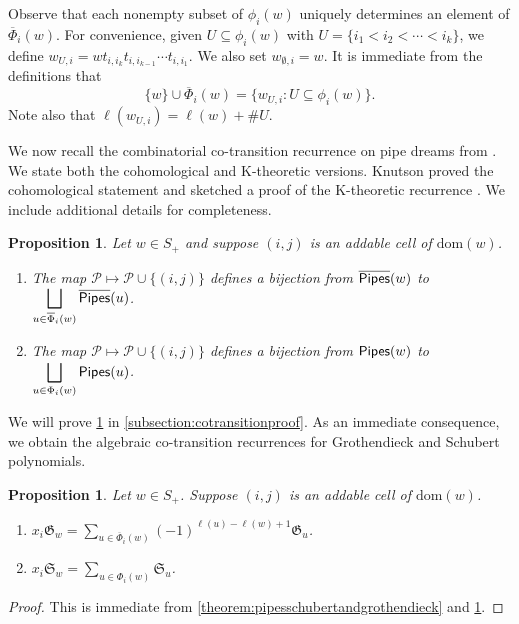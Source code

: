 \documentclass[12 pt]{amsart}
\newcommand{\dom}{\mathrm{dom}}
\newtheorem{proposition}[Theorem]{Proposition}
\numberwithin{equation}{section}
\theoremstyle{remark}
\newcommand{\pipes}{{\sf Pipes}}
\newcommand{\kpipes}{\overline{\sf Pipes}}
\newcommand{\cotransitionperms}{\Phi}
\newcommand{\cotransitionindices}{\phi}
\newcommand{\kcotransitionperms}{\overline{\Phi}}
\begin{document}
		Observe that each nonempty subset of $\cotransitionindices_i(w)$ uniquely determines an element of $\kcotransitionperms_i(w)$. 
		For convenience, given $U \subseteq \cotransitionindices_i(w)$ with $U = \{i_1 < i_2 < \cdots < i_k\}$, we define 
		$w_{U,i} = wt_{i,i_k} t_{i,i_{k-1}}\cdots t_{i,i_1}$. We also set $w_{\emptyset,i} = w$. It is immediate from the definitions that
		\begin{equation}
		\{w\}\cup \kcotransitionperms_i(w) = \{w_{U,i} : U \subseteq \cotransitionindices_{i}(w)\}.
		\end{equation}
		Note also that $\ell(w_{U,i})=\ell(w)+\#U$.
		
		We now recall the combinatorial co-transition recurrence on pipe dreams from \cite{Knutson:cotransition}. 
		We state both the cohomological and K-theoretic versions. 
		Knutson proved the cohomological statement and sketched a proof of the K-theoretic recurrence \cite{Knutson:cotransition}.
		We include additional details for completeness.
		
		\begin{proposition}
			\label{prop:kcotransitionpipefacts}
			Let $w \in S_+$ and suppose $(i,j)$ is an addable cell of $\dom(w)$.
			\begin{enumerate}
				\item The map $\mathcal{P} \mapsto \mathcal{P} \cup \{(i,j)\}$ defines a bijection from $\kpipes(w)$ to $\displaystyle \bigsqcup_{u \in \kcotransitionperms_i(w)} \kpipes(u)$.
				\item The map $\mathcal{P} \mapsto \mathcal{P} \cup \{(i,j)\}$ defines a bijection from $\pipes(w)$ to $\displaystyle \bigsqcup_{u \in\cotransitionperms_i(w)} \pipes(u)$.
			\end{enumerate}
		\end{proposition}
		We will prove \cref{prop:kcotransitionpipefacts} in \cref{subsection:cotransitionproof}.
		As an immediate consequence, we obtain the algebraic co-transition recurrences for Grothendieck and Schubert polynomials.
	
	\begin{proposition}
		\label{prop:kcotransition}
		Let $w \in S_+$. Suppose $(i,j)$ is an addable cell of $\dom(w)$.
		\begin{enumerate}
			\item $\displaystyle x_i\mathfrak{G}_w = \sum_{u \in \kcotransitionperms_i(w)} (-1)^{\ell(u) - \ell(w) + 1}\mathfrak{G}_u$.
			\item $x_i \displaystyle \mathfrak{S}_w = \sum_{u \in \cotransitionperms_i(w)} \mathfrak{S}_{u}$.
		\end{enumerate}
	\end{proposition}
	\begin{proof}
		This is immediate from \cref{theorem:pipesschubertandgrothendieck} and \cref{prop:kcotransitionpipefacts}. 
	\end{proof}
	
\end{document}
